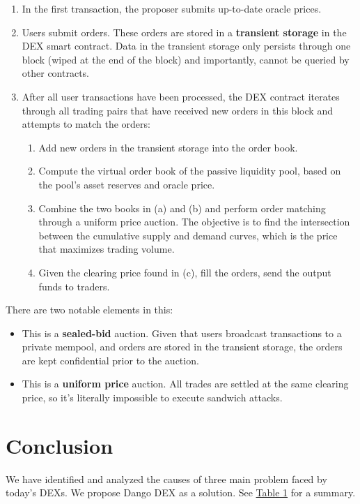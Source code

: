 \documentclass{article}
\begin{document}
\begin{enumerate}
  \item In the first transaction, the proposer submits up-to-date oracle prices.
  \item Users submit orders. These orders are stored in a \textbf{transient storage} in the DEX smart contract. Data in the transient storage only persists through one block (wiped at the end of the block) and importantly, cannot be queried by other contracts.
  \item After all user transactions have been processed, the DEX contract iterates through all trading pairs that have received new orders in this block and attempts to match the orders:
        \begin{enumerate}
          \item Add new orders in the transient storage into the order book.
          \item Compute the virtual order book of the passive liquidity pool, based on the pool's asset reserves and oracle price.
          \item Combine the two books in (a) and (b) and perform order matching through a uniform price auction.\supercite{uniformpriceauctions} The objective is to find the intersection between the cumulative supply and demand curves, which is the price that maximizes trading volume.
          \item Given the clearing price found in (c), fill the orders, send the output funds to traders.
        \end{enumerate}
\end{enumerate}

There are two notable elements in this:

\begin{itemize}
  \item This is a \textbf{sealed-bid} auction. Given that users broadcast transactions to a private mempool, and orders are stored in the transient storage, the orders are kept confidential prior to the auction.
  \item This is a \textbf{uniform price} auction. All trades are settled at the same clearing price, so it's literally impossible to execute sandwich attacks.
\end{itemize}

\section{Conclusion}

We have identified and analyzed the causes of three main problem faced by today's DEXs. We propose Dango DEX as a solution. See \hyperref[tab:conclusion]{Table 1} for a summary.
\end{document}
